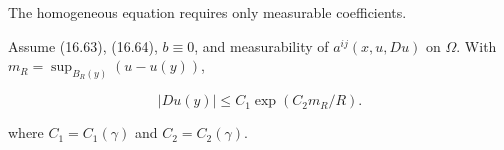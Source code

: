 The homogeneous equation requires only measurable coefficients.

\begin{theorem}\label{gilbarg-trudinger.thm.16.21.two-dimensional-gradient-estimate}
Assume (16.63), (16.64), $b\equiv0$, and measurability of $a^{ij}(x,u,Du)$ on $\Omega$.
With $m_R=\sup_{B_R(y)}(u-u(y))$,

\begin{equation}
|Du(y)| \le C_1 \exp(C_2 m_R / R).
\tag{16.109}
\end{equation}

where $C_1=C_1(\gamma)$ and $C_2=C_2(\gamma)$.
\end{theorem}

